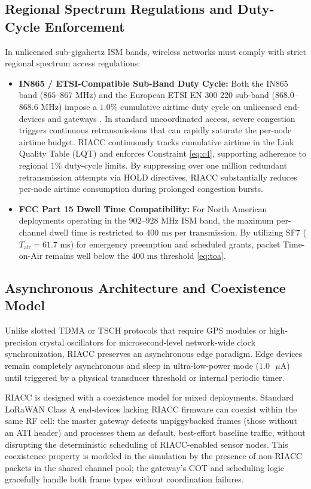 \documentclass[preprint,review,12pt]{elsarticle}
\begin{document}
\subsection{Regional Spectrum Regulations and Duty-Cycle Enforcement}
In unlicensed sub-gigahertz ISM bands, wireless networks must comply with strict regional spectrum access regulations:
\begin{itemize}
    \item \textbf{IN865 / ETSI-Compatible Sub-Band Duty Cycle:} Both the IN865 band ($865$--$867\text{ MHz}$) and the European ETSI EN 300 220 sub-band ($868.0$--$868.6\text{ MHz}$) impose a $1.0\%$ cumulative airtime duty cycle on unlicensed end-devices and gateways \cite{adelantado2017understanding}. In standard uncoordinated access, severe congestion triggers continuous retransmissions that can rapidly saturate the per-node airtime budget. RIACC continuously tracks cumulative airtime in the Link Quality Table (LQT) and enforces Constraint \eqref{eq:c4}, supporting adherence to regional $1\%$ duty-cycle limits. By suppressing over one million redundant retransmission attempts via HOLD directives, RIACC substantially reduces per-node airtime consumption during prolonged congestion bursts.
    \item \textbf{FCC Part 15 Dwell Time Compatibility:} For North American deployments operating in the $902$--$928\text{ MHz}$ ISM band, the maximum per-channel dwell time is restricted to $400\text{ ms}$ per transmission. By utilizing SF7 ($T_{\text{air}} = 61.7\text{ ms}$) for emergency preemption and scheduled grants, packet Time-on-Air remains well below the $400\text{ ms}$ threshold \eqref{eq:toa}.
\end{itemize}

\subsection{Asynchronous Architecture and Coexistence Model}
Unlike slotted TDMA or TSCH protocols that require GPS modules or high-precision crystal oscillators for microsecond-level network-wide clock synchronization, RIACC preserves an asynchronous edge paradigm. Edge devices remain completely asynchronous and sleep in ultra-low-power mode ($1.0\text{ }\mu\text{A}$) until triggered by a physical transducer threshold or internal periodic timer.

RIACC is designed with a coexistence model for mixed deployments. Standard LoRaWAN Class A end-devices lacking RIACC firmware can coexist within the same RF cell: the master gateway detects unpiggybacked frames (those without an ATI header) and processes them as default, best-effort baseline traffic, without disrupting the deterministic scheduling of RIACC-enabled sensor nodes. This coexistence property is modeled in the simulation by the presence of non-RIACC packets in the shared channel pool; the gateway's COT and scheduling logic gracefully handle both frame types without coordination failures.
\end{document}
